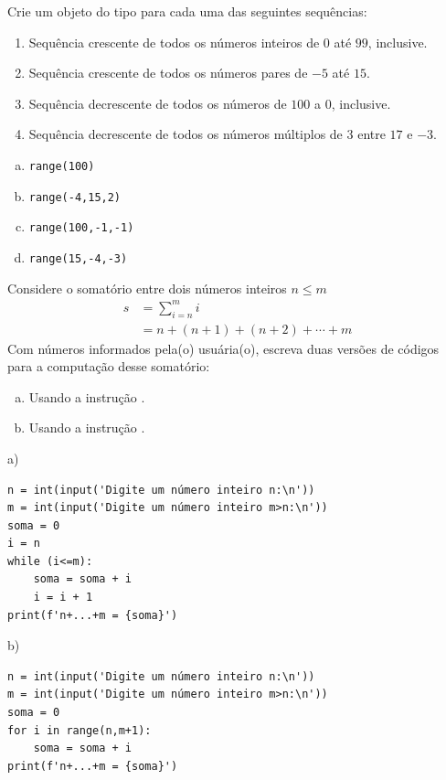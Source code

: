 \begin{exer}
  Crie um objeto do tipo {\PYTHONrange} para cada uma das seguintes sequências:
  \begin{enumerate}
  \item Sequência crescente de todos os números inteiros de $0$ até $99$, inclusive.
  \item Sequência crescente de todos os números pares de $-5$ até $15$.
  \item Sequência decrescente de todos os números de $100$ a $0$, inclusive.
  \item Sequência decrescente de todos os números múltiplos de $3$ entre $17$ e $-3$.
  \end{enumerate}
\end{exer}
\begin{resp}
  \begin{enumerate}[a)]
  \item \lstinline+range(100)+
  \item \lstinline+range(-4,15,2)+
  \item \lstinline+range(100,-1,-1)+
  \item \lstinline+range(15,-4,-3)+
  \end{enumerate}
\end{resp}

\begin{exer}
  Considere o somatório entre dois números inteiros $n \leq m$
  \begin{align}
    s &= \sum_{i=n}^m i\\
      &= n + (n+1) + (n+2) + \cdots + m
  \end{align}
  Com números informados pela(o) usuária(o), escreva duas versões de códigos para a computação desse somatório:
  \begin{enumerate}[a)]
  \item Usando a instrução {\PYTHONwhile}.
  \item Usando a instrução {\PYTHONfor}.
  \end{enumerate}
\end{exer}
\begin{resp}
a)

\begin{lstlisting}
n = int(input('Digite um número inteiro n:\n'))
m = int(input('Digite um número inteiro m>n:\n'))
soma = 0
i = n
while (i<=m):
    soma = soma + i
    i = i + 1
print(f'n+...+m = {soma}')
\end{lstlisting}

b)

\begin{lstlisting}
n = int(input('Digite um número inteiro n:\n'))
m = int(input('Digite um número inteiro m>n:\n'))
soma = 0
for i in range(n,m+1):
    soma = soma + i
print(f'n+...+m = {soma}')
\end{lstlisting}

\end{resp}

